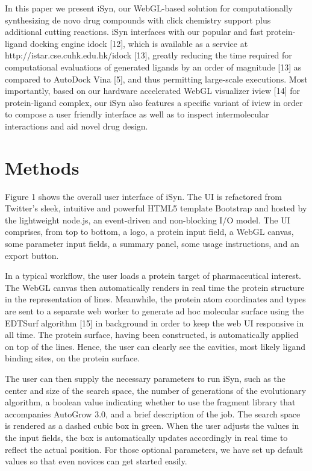In this paper we present iSyn, our WebGL-based solution for computationally synthesizing de novo drug compounds with click chemistry support plus additional cutting reactions. iSyn interfaces with our popular and fast protein-ligand docking engine idock [12], which is available as a service at http://istar.cse.cuhk.edu.hk/idock [13], greatly reducing the time required for computational evaluations of generated ligands by an order of magnitude [13] as compared to AutoDock Vina [5], and thus permitting large-scale executions. Most importantly, based on our hardware accelerated WebGL visualizer iview [14] for protein-ligand complex, our iSyn also features a specific variant of iview in order to compose a user friendly interface as well as to inspect intermolecular interactions and aid novel drug design.

\section{Methods}

Figure 1 shows the overall user interface of iSyn. The UI is refactored from Twitter’s sleek, intuitive and powerful HTML5 template Bootstrap and hosted by the lightweight node.js, an event-driven and non-blocking I/O model. The UI comprises, from top to bottom, a logo, a protein input field, a WebGL canvas, some parameter input fields, a summary panel, some usage instructions, and an export button.

In a typical workflow, the user loads a protein target of pharmaceutical interest. The WebGL canvas then automatically renders in real time the protein structure in the representation of lines. Meanwhile, the protein atom coordinates and types are sent to a separate web worker to generate ad hoc molecular surface using the EDTSurf algorithm [15] in background in order to keep the web UI responsive in all time. The protein surface, having been constructed, is automatically applied on top of the lines. Hence, the user can clearly see the cavities, most likely ligand binding sites, on the protein surface.

The user can then supply the necessary parameters to run iSyn, such as the center and size of the search space, the number of generations of the evolutionary algorithm, a boolean value indicating whether to use the fragment library that accompanies AutoGrow 3.0, and a brief description of the job. The search space is rendered as a dashed cubic box in green. When the user adjusts the values in the input fields, the box is automatically updates accordingly in real time to reflect the actual position. For those optional parameters, we have set up default values so that even novices can get started easily.

